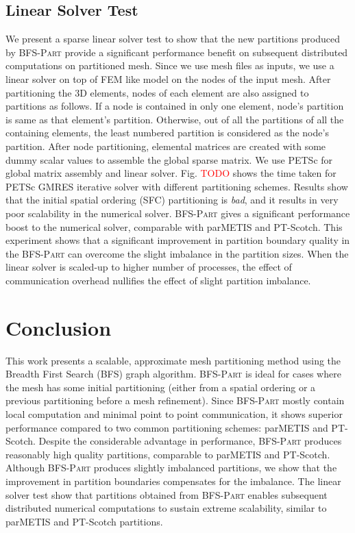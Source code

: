 \documentclass[conference]{IEEEtran}
\newcommand{\bfspart}{\textsc{BFS-Part}\xspace}
\begin{document}
\subsection{Linear Solver Test}
We present a sparse linear solver test to show that the new partitions produced by \bfspart provide a significant performance benefit on subsequent distributed computations on partitioned mesh. Since we use mesh files as inputs, we use a linear solver on top of FEM like model on the nodes of the input mesh. After partitioning the 3D elements, nodes of each element are also assigned to partitions as follows. If a node is contained in only one element, node's partition is same as that element's partition. Otherwise, out of all the partitions of all the containing elements, the least numbered partition is considered as the node's partition. After node partitioning, elemental matrices are created with some dummy scalar values to assemble the global sparse matrix. We use PETSc \cite{petsc-web-page} for global matrix assembly and linear solver. Fig. \textcolor{red}{TODO} shows the time taken for PETSc GMRES \cite{GMRES} iterative solver with different partitioning schemes. Results show that the initial spatial ordering (SFC) partitioning is \emph{bad}, and it results in very poor scalability in the numerical solver. \bfspart gives a significant performance boost to the numerical solver, comparable with parMETIS and PT-Scotch. This experiment shows that a significant improvement in partition boundary quality in the \bfspart can overcome the slight imbalance in the partition sizes. When the linear solver is scaled-up to higher number of processes, the effect of communication overhead nullifies the effect of slight partition imbalance. 

\section{Conclusion}
This work presents a scalable, approximate mesh partitioning method using the Breadth First Search (BFS) graph algorithm. \bfspart is ideal for cases where the mesh has some initial partitioning (either from a spatial ordering or a previous partitioning before a mesh refinement). Since \bfspart mostly contain local computation and minimal point to point communication, it shows superior performance compared to two common partitioning schemes: parMETIS and PT-Scotch. Despite the considerable advantage in performance, \bfspart produces reasonably high quality partitions, comparable to parMETIS and PT-Scotch. Although \bfspart produces slightly imbalanced partitions, we show that the improvement in partition boundaries compensates for the imbalance. The linear solver test show that partitions obtained from \bfspart enables subsequent distributed numerical computations to sustain extreme scalability, similar to parMETIS and PT-Scotch partitions. 
\end{document}
